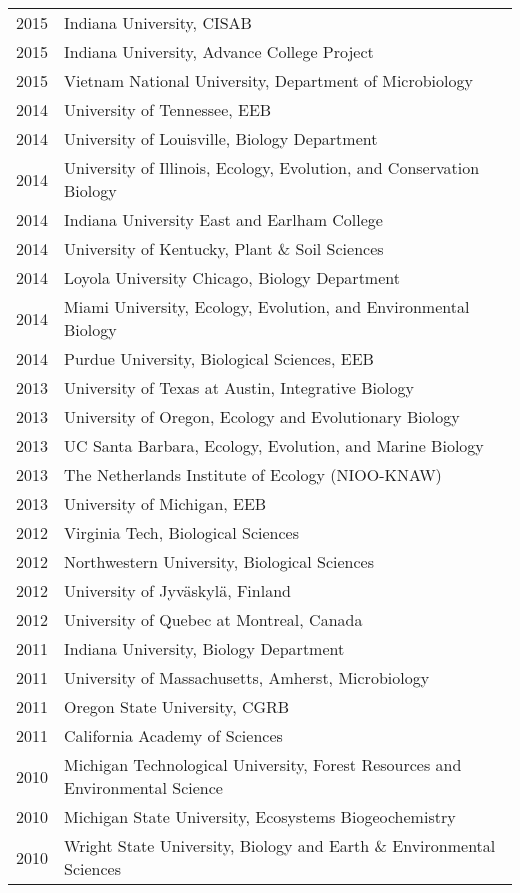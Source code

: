\documentclass[11pt]{article}
\begin{document}
\begin{longtable}{@{}p{3em}@{\hspace{1.5em}}p{}@{}}
2015 & Indiana University, CISAB \\
2015 & Indiana University, Advance College Project \\
2015 & Vietnam National University, Department of Microbiology \\
2014 & University of Tennessee, EEB \\
2014 & University of Louisville, Biology Department \\
2014 & University of Illinois, Ecology, Evolution, and Conservation Biology \\
2014 & Indiana University East and Earlham College \\
2014 & University of Kentucky, Plant \& Soil Sciences \\
2014 & Loyola University Chicago, Biology Department \\
2014 & Miami University, Ecology, Evolution, and Environmental Biology \\
2014 & Purdue University, Biological Sciences, EEB \\
2013 & University of Texas at Austin, Integrative Biology \\
2013 & University of Oregon, Ecology and Evolutionary Biology \\
2013 & UC Santa Barbara, Ecology, Evolution, and Marine Biology \\
2013 & The Netherlands Institute of Ecology (NIOO-KNAW) \\
2013 & University of Michigan, EEB \\
2012 & Virginia Tech, Biological Sciences \\
2012 & Northwestern University, Biological Sciences \\
2012 & University of Jyväskylä, Finland \\
2012 & University of Quebec at Montreal, Canada \\
2011 & Indiana University, Biology Department \\
2011 & University of Massachusetts, Amherst, Microbiology \\
2011 & Oregon State University, CGRB \\
2011 & California Academy of Sciences \\
2010 & Michigan Technological University, Forest Resources and Environmental Science \\
2010 & Michigan State University, Ecosystems Biogeochemistry \\
2010 & Wright State University, Biology and Earth \& Environmental Sciences \\

\end{longtable}
\end{document}
